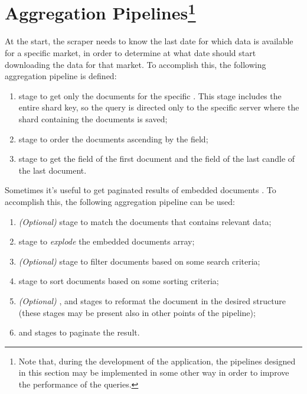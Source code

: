 \section[Aggregation Pipelines]{Aggregation Pipelines\footnote{Note that, during
the development of the application, the pipelines designed in this section may
be implemented in some other way  in order to improve the performance of the
queries.}}\label{sec:aggregations}

At the start, the scraper needs to know the last date for which data is
available for a specific market, in order to determine at what date should start
downloading the data for that market. To accomplish this, the following
aggregation pipeline is defined:
\begin{enumerate}
	\item {} stage to get only the documents for the specific
		. This stage includes the entire shard key, so the
		query is directed only to the specific server where the shard
		containing the documents is saved;
	\item {} stage to order the documents ascending by the
		 field;
	\item {} stage to get the  field of the first
		document and the  field of the last candle of
		the last document.
\end{enumerate}

Sometimes it's useful to get paginated results of embedded documents
.
To accomplish this, the following aggregation pipeline can be used:
\begin{enumerate}
	\item \textit{(Optional)}  stage to match the documents
		that contains relevant data;
	\item {} stage to \emph{explode} the embedded documents
		array;
	\item \textit{(Optional)}  stage to filter documents based
		on some search criteria;
	\item {} stage to sort documents based on some sorting
		criteria;
	\item \textit{(Optional)} ,  and
		 stages to reformat the document in the
		desired structure (these stages may be present also in other
		points of the pipeline);
	\item {} and  stages to paginate the result.
\end{enumerate}

